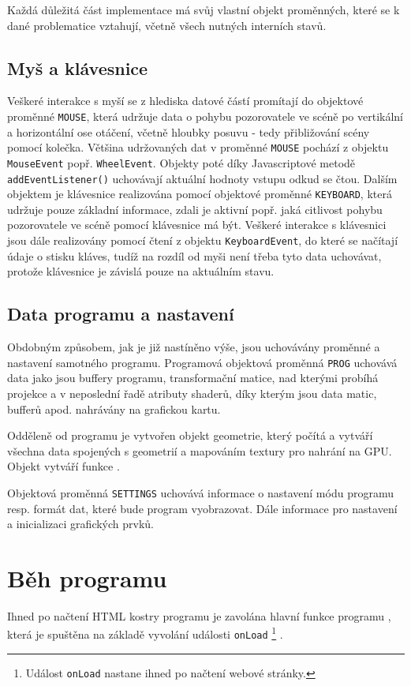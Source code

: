 Každá důležitá část implementace má svůj vlastní objekt proměnných, které se k dané problematice vztahují, včetně všech nutných interních stavů.

\subsection{Myš a klávesnice}
Veškeré interakce s myší se z hlediska datové částí promítají do objektové proměnné \texttt{MOUSE}, která udržuje data o pohybu pozorovatele ve scéně po vertikální a horizontální ose otáčení, včetně hloubky posuvu - tedy přibližování scény pomocí kolečka. Většina udržovaných dat v proměnné \texttt{MOUSE} pochází z objektu \texttt{MouseEvent} popř. \texttt{WheelEvent}. Objekty poté díky Javascriptové metodě \texttt{addEventListener()} uchovávají aktuální hodnoty vstupu odkud se čtou.
Dalším objektem je klávesnice realizována pomocí objektové proměnné \texttt{KEYBOARD}, která udržuje pouze základní informace, zdali je aktivní popř. jaká citlivost pohybu pozorovatele ve scéně pomocí klávesnice má být. Veškeré interakce s klávesnici jsou dále realizovány pomocí čtení z objektu \texttt{KeyboardEvent}, do které se načítají údaje o stisku kláves, tudíž na rozdíl od myši není třeba tyto data uchovávat, protože klávesnice je závislá pouze na aktuálním stavu. 

\newpage

\subsection{Data programu a nastavení}
Obdobným způsobem, jak je již nastíněno výše, jsou uchovávány proměnné a nastavení samotného programu. Programová objektová proměnná \texttt{PROG} uchovává data jako jsou buffery programu, transformační matice, nad kterými probíhá projekce a v neposlední řadě atributy shaderů, díky kterým jsou data matic, bufferů apod. nahrávány na grafickou kartu. 

Odděleně od programu je vytvořen objekt geometrie, který počítá a vytváří všechna data spojených s geometrií a mapováním textury pro nahrání na GPU. Objekt vytváří funkce \texttt{\createSphereGeometry}.

Objektová proměnná \texttt{SETTINGS} uchovává informace o nastavení módu programu resp. formát dat, které bude program vyobrazovat. Dále informace pro nastavení a inicializaci grafických prvků.


\section{Běh programu}
Ihned po načtení HTML kostry programu je zavolána hlavní funkce programu \texttt{\main}, která je spuštěna  na základě vyvolání události \texttt{onLoad} \footnote{ Událost \texttt{onLoad} nastane ihned po načtení webové stránky.} .


